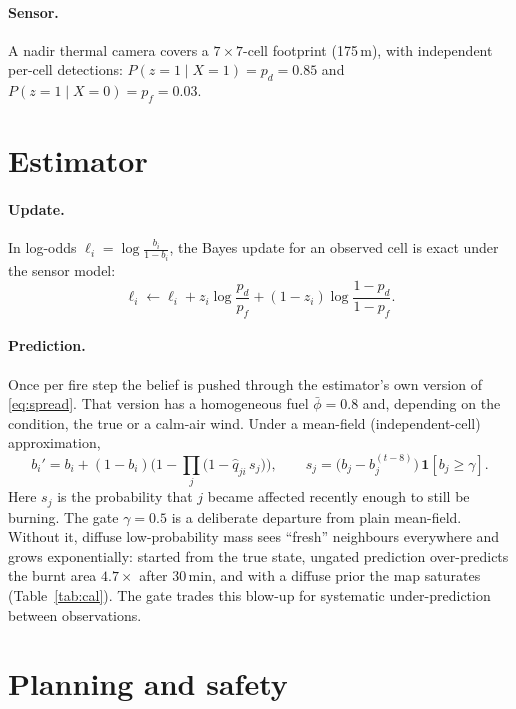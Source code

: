 \documentclass[10pt,a4paper]{article}
\begin{document}
\paragraph{Sensor.} A nadir thermal camera covers a $7\times7$-cell footprint (175\,m), with independent per-cell detections: $P(z{=}1\mid X{=}1)=p_d=0.85$ and $P(z{=}1\mid X{=}0)=p_f=0.03$.

\section{Estimator}
\paragraph{Update.} In log-odds $\ell_i=\log\frac{b_i}{1-b_i}$, the Bayes update for an observed cell is exact under the sensor model:
\begin{equation}
\ell_i \leftarrow \ell_i + z_i\log\frac{p_d}{p_f} + (1-z_i)\log\frac{1-p_d}{1-p_f}.
\end{equation}

\paragraph{Prediction.} Once per fire step the belief is pushed through the estimator's own version of \eqref{eq:spread}. That version has a homogeneous fuel $\bar\phi=0.8$ and, depending on the condition, the true or a calm-air wind. Under a mean-field (independent-cell) approximation,
\begin{equation}
b_i' = b_i + (1-b_i)\Big(1-\prod_{j}\big(1-\hat q_{ji}\, s_j\big)\Big),\qquad
s_j = \big(b_j - b_j^{(t-8)}\big)\,\mathbf{1}[b_j\ge \gamma].
\label{eq:predict}
\end{equation}
Here $s_j$ is the probability that $j$ became affected recently enough to still be burning. The gate $\gamma=0.5$ is a deliberate departure from plain mean-field. Without it, diffuse low-probability mass sees ``fresh'' neighbours everywhere and grows exponentially: started from the true state, ungated prediction over-predicts the burnt area $4.7\times$ after 30\,min, and with a diffuse prior the map saturates (Table~\ref{tab:cal}). The gate trades this blow-up for systematic under-prediction between observations.

\section{Planning and safety}
\end{document}
